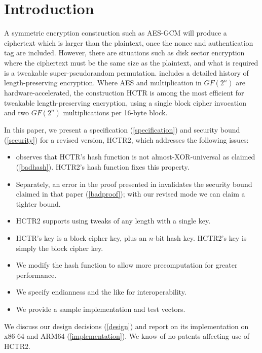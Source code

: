 \documentclass[hctr.tex]{subfiles}
\begin{document}
\section{Introduction}
A symmetric encryption construction such as AES-GCM\cite{gcm}
will produce a ciphertext which is larger than
the plaintext, once the nonce and authentication tag are included. However,
there are situations such as disk sector encryption
where the ciphertext must be the same size as the
plaintext, and what is required is a tweakable
super-pseudorandom permutation\cite{cmc}. 
\cite{adiantum} includes a detailed history of length-preserving encryption.
Where AES and multiplication in \(GF(2^n)\) are hardware-accelerated,
the construction HCTR\cite{hctr} is among the most efficient for 
tweakable length-preserving encryption, using
a single block cipher invocation and two \(GF(2^n)\) multiplications
per 16-byte block.

In this paper, we present 
a specification (\autoref{specification})
and security bound (\autoref{security})
for a revised version, HCTR2, which 
addresses the following issues:
\begin{itemize}
    \item \cite{kumarhctr} observes that HCTR's hash function
    is not almost-XOR-universal\cite{eadu} as claimed (\autoref{badhash}).
    HCTR2's hash function fixes this property.
    \item Separately,
    an error in the proof presented in \cite{hctrquad}
    invalidates the security bound claimed in that paper (\autoref{badproof}); with our revised
    mode we can claim a tighter bound.
    \item HCTR2 supports using tweaks of any length with a single key.
    \item HCTR's key is a block cipher key, plus an \(n\)-bit
    hash key. HCTR2's key is simply
    the block cipher key.
    \item We modify the hash function to allow more precomputation
    for greater performance.
    \item We specify endianness and the like for interoperability.
    \item We provide a sample implementation and test vectors.
\end{itemize}
We discuss our design decisions (\autoref{design})
and report on its implementation on x86-64 and ARM64 (\autoref{implementation}).
We know of no patents affecting use of HCTR2.

\end{document}
